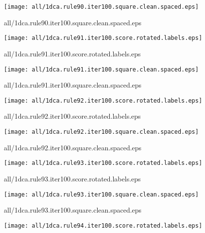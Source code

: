 \documentclass{article}
\begin{document}
\begin{center}
\begin{minipage}{\textwidth}
\texttt{[image: all/1dca.rule90.iter100.square.clean.spaced.eps]}
\end{minipage}
\end{center}
{\footnotesize all/1dca.rule90.iter100.square.clean.spaced.eps}
\begin{center}
\begin{minipage}{\textwidth}
\texttt{[image: all/1dca.rule91.iter100.score.rotated.labels.eps]}
\end{minipage}
\end{center}
{\footnotesize all/1dca.rule91.iter100.score.rotated.labels.eps}
\begin{center}
\begin{minipage}{\textwidth}
\texttt{[image: all/1dca.rule91.iter100.square.clean.spaced.eps]}
\end{minipage}
\end{center}
{\footnotesize all/1dca.rule91.iter100.square.clean.spaced.eps}
\begin{center}
\begin{minipage}{\textwidth}
\texttt{[image: all/1dca.rule92.iter100.score.rotated.labels.eps]}
\end{minipage}
\end{center}
{\footnotesize all/1dca.rule92.iter100.score.rotated.labels.eps}
\begin{center}
\begin{minipage}{\textwidth}
\texttt{[image: all/1dca.rule92.iter100.square.clean.spaced.eps]}
\end{minipage}
\end{center}
{\footnotesize all/1dca.rule92.iter100.square.clean.spaced.eps}
\begin{center}
\begin{minipage}{\textwidth}
\texttt{[image: all/1dca.rule93.iter100.score.rotated.labels.eps]}
\end{minipage}
\end{center}
{\footnotesize all/1dca.rule93.iter100.score.rotated.labels.eps}
\begin{center}
\begin{minipage}{\textwidth}
\texttt{[image: all/1dca.rule93.iter100.square.clean.spaced.eps]}
\end{minipage}
\end{center}
{\footnotesize all/1dca.rule93.iter100.square.clean.spaced.eps}
\begin{center}
\begin{minipage}{\textwidth}
\texttt{[image: all/1dca.rule94.iter100.score.rotated.labels.eps]}
\end{minipage}
\end{center}
\end{document}
